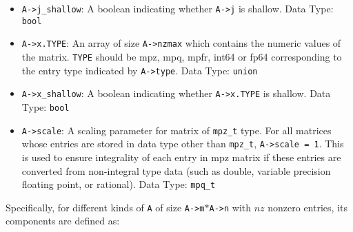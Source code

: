 \documentclass[12pt]{article}
\theoremstyle{definition}
\begin{document}
\begin{itemize}
\item \verb|A->j_shallow|: A boolean indicating whether \verb|A->j| is shallow.
Data Type: \verb|bool|

\item \verb|A->x.TYPE|: An array of size \verb|A->nzmax| which contains the
numeric values of the matrix. \verb|TYPE| should be mpz, mpq, mpfr, int64 or
fp64 corresponding to the entry type indicated by \verb|A->type|. Data Type:
\verb|union|

\item \verb|A->x_shallow|: A boolean indicating whether \verb|A->x.TYPE| is
shallow. Data Type: \verb|bool|

\item \verb|A->scale|: A scaling parameter for matrix of \verb|mpz_t| type. For
all matrices whose entries are stored in data type other than \verb|mpz_t|,
\verb|A->scale = 1|. This is used to ensure integrality of each entry in mpz
matrix if these entries are converted from non-integral type data (such as
double, variable precision floating point, or rational). Data Type:
\verb|mpq_t|

\end{itemize}

Specifically, for different kinds of \verb|A| of size \verb|A->m|$*$\verb|A->n| with $nz$ nonzero entries, its components are defined as:
\end{document}
